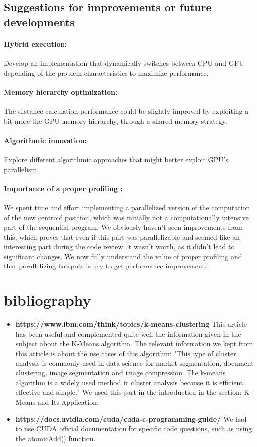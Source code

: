\documentclass[sigconf]{acmart}
\begin{document}
\subsection{Suggestions for improvements or future developments}

\paragraph{Hybrid execution:} Develop an implementation that dynamically switches between CPU and GPU depending of the problem characteristics to maximize performance.
\paragraph{Memory hierarchy optimization:} The distance calculation performance could be slightly improved by exploiting a bit more the GPU memory hierarchy, through a shared memory strategy.
\paragraph{Algorithmic innovation:} Explore different algorithmic approaches that might better exploit GPU's parallelism.
\paragraph{Importance of a proper profiling :} We spent time and effort implementing a parallelized version of the computation of the new centroid position, which was initially not a computationally intensive part of the sequential program. We obviously haven't seen improvements from this, which proves that even if this part was parallelizable and seemed like an interesting part during the code review, it wasn't worth, as it didn't lead to significant changes.
We now fully understand the value of proper profiling and that parallelizing hotspots is key to get performance improvements.

\section{bibliography}
\begin{itemize}
    \item \textbf{https://www.ibm.com/think/topics/k-means-clustering}
    This article has been useful and complemented quite well the information given in the subject about the K-Means algorithm.
    The relevant information we kept from this article is about the use cases of this algorithm:
    "This type of cluster analysis is commonly used in data science for market segmentation, document clustering, image segmentation and image compression. The k-means algorithm is a widely used method in cluster analysis because it is efficient, effective and simple."
    We used this part in the introduction in the section: K-Means and Its Application.
    \item \textbf{https://docs.nvidia.com/cuda/cuda-c-programming-guide/}
    We had to use CUDA official documentation for specific code questions, such as using the atomicAdd() function.
\end{itemize}
\end{document}
